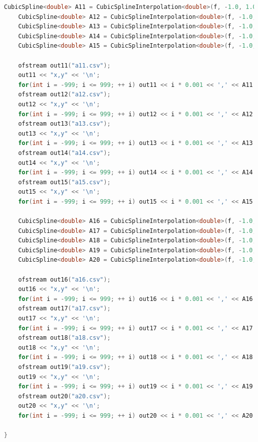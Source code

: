 \documentclass{ctexart}
\begin{document}
\begin{lstlisting}[language={c++}]
	CubicSpline<double> A11 = CubicSplineInterpolation<double>(f, -1.0, 1.0, 5, "Natural");
	CubicSpline<double> A12 = CubicSplineInterpolation<double>(f, -1.0, 1.0, 10, "Natural");
	CubicSpline<double> A13 = CubicSplineInterpolation<double>(f, -1.0, 1.0, 20, "Natural");
	CubicSpline<double> A14 = CubicSplineInterpolation<double>(f, -1.0, 1.0, 40, "Natural");
	CubicSpline<double> A15 = CubicSplineInterpolation<double>(f, -1.0, 1.0, 80, "Natural");
	
	ofstream out11("a11.csv");
	out11 << "x,y" << '\n';
	for(int i = -999; i <= 999; ++ i) out11 << i * 0.001 << ',' << A11.GetValue(i * 0.001) << '\n';
	ofstream out12("a12.csv");
	out12 << "x,y" << '\n';
	for(int i = -999; i <= 999; ++ i) out12 << i * 0.001 << ',' << A12.GetValue(i * 0.001) << '\n';
	ofstream out13("a13.csv");
	out13 << "x,y" << '\n';
	for(int i = -999; i <= 999; ++ i) out13 << i * 0.001 << ',' << A13.GetValue(i * 0.001) << '\n';
	ofstream out14("a14.csv");
	out14 << "x,y" << '\n';
	for(int i = -999; i <= 999; ++ i) out14 << i * 0.001 << ',' << A14.GetValue(i * 0.001) << '\n';
	ofstream out15("a15.csv");
	out15 << "x,y" << '\n';
	for(int i = -999; i <= 999; ++ i) out15 << i * 0.001 << ',' << A15.GetValue(i * 0.001) << '\n';

	CubicSpline<double> A16 = CubicSplineInterpolation<double>(f, -1.0, 1.0, 5, "Specified_Second_Derivatives");
	CubicSpline<double> A17 = CubicSplineInterpolation<double>(f, -1.0, 1.0, 10, "Specified_Second_Derivatives");
	CubicSpline<double> A18 = CubicSplineInterpolation<double>(f, -1.0, 1.0, 20, "Specified_Second_Derivatives");
	CubicSpline<double> A19 = CubicSplineInterpolation<double>(f, -1.0, 1.0, 40, "Specified_Second_Derivatives");
	CubicSpline<double> A20 = CubicSplineInterpolation<double>(f, -1.0, 1.0, 80, "Specified_Second_Derivatives");

	ofstream out16("a16.csv");
	out16 << "x,y" << '\n';
	for(int i = -999; i <= 999; ++ i) out16 << i * 0.001 << ',' << A16.GetValue(i * 0.001) << '\n';
	ofstream out17("a17.csv");
	out17 << "x,y" << '\n';
	for(int i = -999; i <= 999; ++ i) out17 << i * 0.001 << ',' << A17.GetValue(i * 0.001) << '\n';
	ofstream out18("a18.csv");
	out18 << "x,y" << '\n';
	for(int i = -999; i <= 999; ++ i) out18 << i * 0.001 << ',' << A18.GetValue(i * 0.001) << '\n';
	ofstream out19("a19.csv");
	out19 << "x,y" << '\n';
	for(int i = -999; i <= 999; ++ i) out19 << i * 0.001 << ',' << A19.GetValue(i * 0.001) << '\n';
	ofstream out20("a20.csv");
	out20 << "x,y" << '\n';
	for(int i = -999; i <= 999; ++ i) out20 << i * 0.001 << ',' << A20.GetValue(i * 0.001) << '\n';

}
\end{lstlisting}
\end{document}
